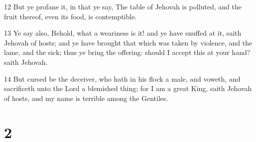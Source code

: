 \par 12 But ye profane it, in that ye say, The table of Jehovah is polluted, and the fruit thereof, even its food, is contemptible.
\par 13 Ye say also, Behold, what a weariness is it! and ye have snuffed at it, saith Jehovah of hosts; and ye have brought that which was taken by violence, and the lame, and the sick; thus ye bring the offering: should I accept this at your hand? saith Jehovah.
\par 14 But cursed be the deceiver, who hath in his flock a male, and voweth, and sacrificeth unto the Lord a blemished thing; for I am a great King, saith Jehovah of hosts, and my name is terrible among the Gentiles.

\chapter{2}


